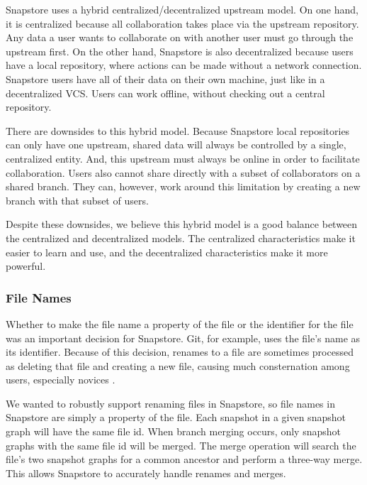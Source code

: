 Snapstore uses a hybrid centralized/decentralized upstream model. On one hand, it is centralized because all collaboration takes place via the upstream repository. Any data a user wants to collaborate on with another user must go through the upstream first. On the other hand, Snapstore is also decentralized because users have a local repository, where actions can be made without a network connection. Snapstore users have all of their data on their own machine, just like in a decentralized VCS. Users can work offline, without checking out a central repository.

There are downsides to this hybrid model. Because Snapstore local repositories can only have one upstream, shared data will always be controlled by a single, centralized entity. And, this upstream must always be online in order to facilitate collaboration. Users also cannot share directly with a subset of collaborators on a shared branch. They can, however, work around this limitation by creating a new branch with that subset of users.

Despite these downsides, we believe this hybrid model is a good balance between the centralized and decentralized models. The centralized characteristics make it easier to learn and use, and the decentralized characteristics make it more powerful.

\subsubsection{File Names}

Whether to make the file name a property of the file or the identifier for the file was an important decision for Snapstore. Git, for example, uses the file's name as its identifier. Because of this decision, renames to a file are sometimes processed as deleting that file and creating a new file, causing much consternation among users, especially novices \cite{RossoJackson}.

We wanted to robustly support renaming files in Snapstore, so file names in Snapstore are simply a property of the file. Each snapshot in a given snapshot graph will have the same file id. When branch merging occurs, only snapshot graphs with the same file id will be merged. The merge operation will search the file's two snapshot graphs for a common ancestor and perform a three-way merge. This allows Snapstore to accurately handle renames and merges.



